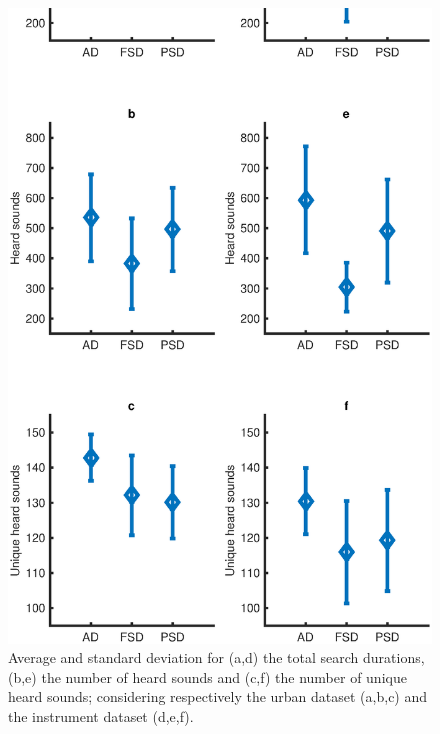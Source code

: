 \documentclass{aes2e}
\begin{document}
\begin{figure}[t]
\begin{center}
\includegraphics[width=\columnwidth]{gfx/urbanMusic1.eps} 
\end{center}
\caption{\label{urbanMusic} Average and standard deviation for (a,d) the total search durations, (b,e) the number of heard sounds and (c,f) the number of unique heard sounds; considering respectively the urban dataset (a,b,c) and the instrument dataset (d,e,f).}
\end{figure}  
\end{document}
